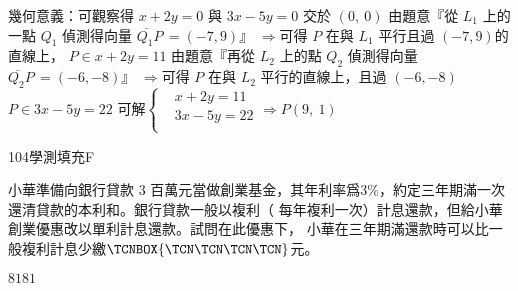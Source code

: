 \begin{QUESTIONS}
\begin{QUESTION}
\begin{QSOLLIST}
			\begin{QSOL}
				 幾何意義：可觀察得 $x+2y=0$ 與 $3x-5y=0$ 交於 $\left( 0,\ 0 \right)$
				  由題意『從 ${{L}_{1}}$ 上的一點 ${{Q}_{1}}$ 偵測得向量 $\lvec{{Q}_{1}P}\,=\left( -7,9 \right)$』
				  $\Rightarrow $可得 $P$ 在與 ${{L}_{1}}$ 平行且過 $\left( -7,9 \right)$的直線上， $P\in x+2y=11$
				  由題意『再從 ${{L}_{2}}$ 上的點 ${{Q}_{2}}$ 偵測得向量 $\lvec{{Q}_{2}P}\,=\left( -6,-8 \right)$』
				  $\Rightarrow $可得 $P$ 在與 ${{L}_{2}}$ 平行的直線上，且過 $\left( -6,-8 \right)$ $P\in 3x-5y=22$
				  可解$\left\{ \begin{aligned}
				  & x+2y=11 \\ 
				 & 3x-5y=22 \\ 
				\end{aligned} \right.\Rightarrow P\left( 9,\ 1 \right)$
			\end{QSOL}
        \end{QSOLLIST}
        \begin{QEMPTYSPACE}
        \end{QEMPTYSPACE}
    \end{QUESTION}
    \begin{QUESTION}
        \begin{ExamInfo}{104}{學測}{填充}{F}
        \end{ExamInfo}
        \begin{ExamAnsRateInfo}{26}{57}{18}{3}
        \end{ExamAnsRateInfo}
        \begin{QBODY}
            小華準備向銀行貸款 $3$ 百萬元當做創業基金，其年利率爲$3\%$，約定三年期滿一次還清貸款的本利和。銀行貸款一般以複利（ 每年複利一次）計息還款，但給小華創業優惠改以單利計息還款。試問在此優惠下， 小華在三年期滿還款時可以比一般複利計息少繳$\TCNBOX{\TCN\TCN\TCN\TCN }$元。
        \end{QBODY}
        \begin{QFROMS}
        \end{QFROMS}
        \begin{QTAGS}\end{QTAGS}
        \begin{QANS}
            $8181$
        \end{QANS}
        \begin{QSOLLIST}
        \end{QSOLLIST}
        \begin{QEMPTYSPACE}
        \end{QEMPTYSPACE}
    \end{QUESTION}

\end{QUESTIONS}
